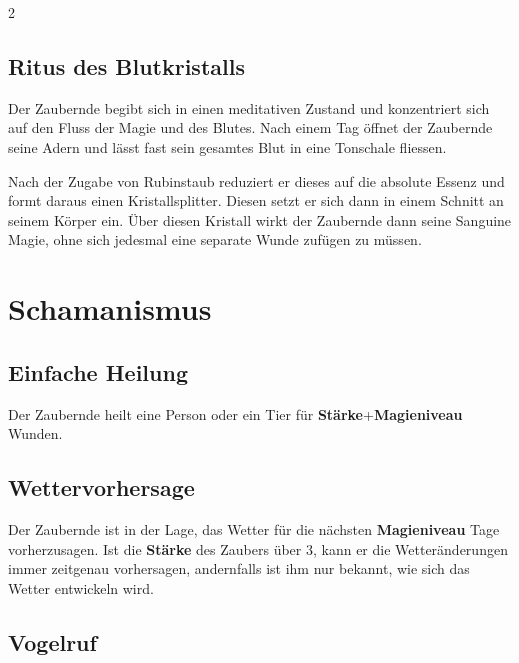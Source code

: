 \begin{multicols*}{2}
\subsection{Ritus des Blutkristalls}

Der Zaubernde begibt sich in einen meditativen Zustand und konzentriert sich auf den Fluss der Magie und des Blutes. Nach einem Tag öffnet der Zaubernde seine Adern und lässt fast sein gesamtes Blut in eine Tonschale fliessen.

Nach der Zugabe von Rubinstaub reduziert er dieses auf die absolute Essenz und formt daraus einen Kristallsplitter. Diesen setzt er sich dann in einem Schnitt an seinem Körper ein. Über diesen Kristall wirkt der Zaubernde dann seine Sanguine Magie, ohne sich jedesmal eine separate Wunde zufügen zu müssen.



\section{Schamanismus}

\subsection{Einfache Heilung}

Der Zaubernde heilt eine Person oder ein Tier für \textbf{Stärke}+\textbf{Magieniveau} Wunden.



\subsection{Wettervorhersage}

Der Zaubernde ist in der Lage, das Wetter für die nächsten \textbf{Magieniveau} Tage vorherzusagen. Ist die \textbf{Stärke} des Zaubers über 3, kann er die Wetteränderungen immer zeitgenau vorhersagen, andernfalls ist ihm nur bekannt, wie sich das Wetter entwickeln wird.



\subsection{Vogelruf}


\end{multicols*}

